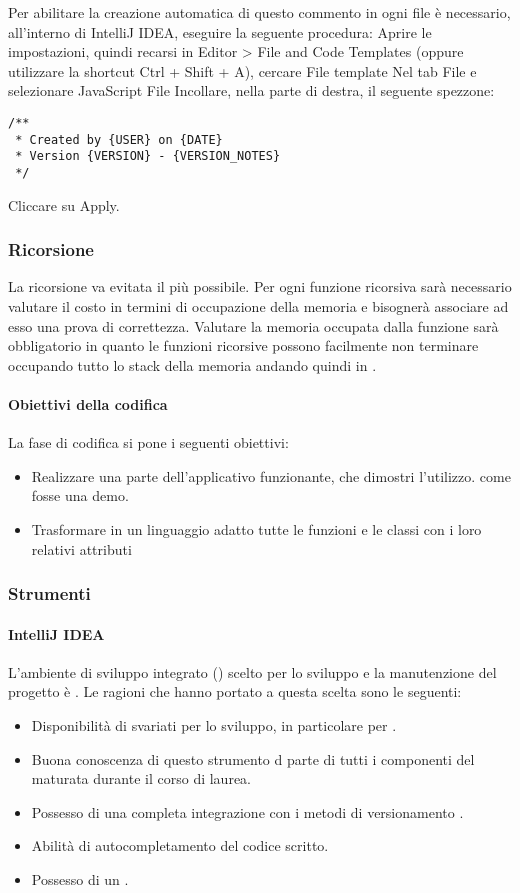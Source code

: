 Per abilitare la creazione automatica di questo commento in ogni file è necessario, all'interno di IntelliJ IDEA, eseguire la seguente procedura:
Aprire le impostazioni, quindi recarsi in Editor > File and Code Templates (oppure  utilizzare la shortcut Ctrl + Shift + A), cercare File template
Nel tab File e selezionare JavaScript File
Incollare, nella parte di destra, il seguente spezzone:
\begin{lstlisting}
/**
 * Created by {USER} on {DATE}
 * Version {VERSION} - {VERSION_NOTES}
 */
\end{lstlisting}
Cliccare su Apply.
  
\subsubsection{Ricorsione}
La ricorsione va evitata il più possibile. Per ogni funzione ricorsiva sarà necessario valutare il costo in termini di occupazione della memoria e bisognerà associare ad esso una prova di correttezza.
Valutare la memoria occupata dalla funzione sarà obbligatorio in quanto le funzioni ricorsive possono facilmente non terminare occupando tutto lo stack della memoria andando quindi in .

\paragraph{Obiettivi della codifica}
La fase di codifica si pone i seguenti obiettivi:
\begin{itemize}
\item Realizzare una parte dell'applicativo funzionante, che dimostri l'utilizzo. come fosse una demo.
\item Trasformare in un linguaggio adatto tutte le funzioni e le classi con i loro relativi attributi 
\end{itemize}

\subsubsection{Strumenti}

\paragraph{IntelliJ IDEA}
L'ambiente di sviluppo integrato () scelto per lo sviluppo e la manutenzione del progetto è . Le ragioni che hanno portato a questa scelta sono le seguenti:
\begin{itemize}
\item Disponibilità di svariati  per lo sviluppo, in particolare per .
\item Buona conoscenza di questo strumento d parte di tutti i componenti del  maturata durante il corso di laurea.
\item Possesso di una completa integrazione con i metodi di versionamento .
\item Abilità di autocompletamento del codice  scritto.
\item Possesso di un  .
\end{itemize}


